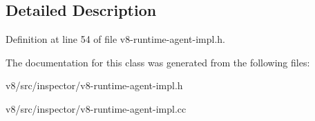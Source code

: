 \subsection{Detailed Description}


Definition at line 54 of file v8-\/runtime-\/agent-\/impl.\+h.



The documentation for this class was generated from the following files\+:\begin{DoxyCompactItemize}
\item 
v8/src/inspector/v8-\/runtime-\/agent-\/impl.\+h\item 
v8/src/inspector/v8-\/runtime-\/agent-\/impl.\+cc\end{DoxyCompactItemize}
